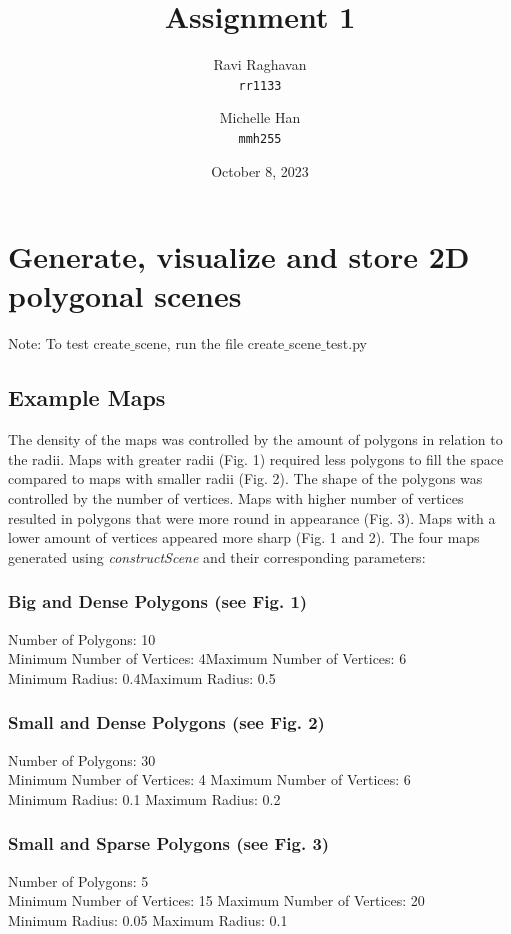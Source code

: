 \documentclass{article}
\title{Assignment 1}
\date{October 8, 2023}
\author{
  Ravi Raghavan\\
  \texttt{rr1133}
  \and
  Michelle Han\\
  \texttt{mmh255}
}
\begin{document}
\maketitle
\section{Generate, visualize and store 2D polygonal scenes}
Note: To test create$\_$scene, run the file create$\_$scene$\_$test.py

\subsection{Example Maps}
The density of the maps was controlled by the amount of polygons in relation to the radii. Maps with greater radii (Fig. 1) required less polygons to fill the space compared to maps with smaller radii (Fig. 2). The shape of the polygons was controlled by the number of vertices. Maps with higher number of vertices resulted in polygons that were more round in appearance (Fig. 3). Maps with a lower amount of vertices appeared more sharp (Fig. 1 and 2). The four maps generated using \textit{constructScene} and their corresponding parameters:
\subsubsection{Big and Dense Polygons (see Fig. 1)}
Number of Polygons: 10
\\Minimum Number of Vertices: 4\space\space\space\space\space\space\space  Maximum Number of Vertices: 6
\\Minimum Radius: 0.4\space\space\space\space\space\space\space\space\space\space\space \space\space\space\space\space\space \space\space\space\space  Maximum Radius: 0.5
\subsubsection{Small and Dense Polygons (see Fig. 2)}
Number of Polygons: 30 
\\Minimum Number of Vertices: 4 \space\space\space\space\space\space\space  Maximum Number of Vertices: 6
\\Minimum Radius: 0.1 \space\space\space\space\space\space\space\space \space\space\space\space \space\space\space\space\space\space \space\space\space Maximum Radius: 0.2
\subsubsection{Small and Sparse Polygons (see Fig. 3)}
Number of Polygons: 5
\\Minimum Number of Vertices: 15 \space\space\space\space\space\space\space Maximum Number of Vertices: 20
\\Minimum Radius: 0.05 \space\space\space\space\space\space\space\space\space\space\space\space \space\space\space\space\space\space \space\space\space Maximum Radius: 0.1
\end{document}
